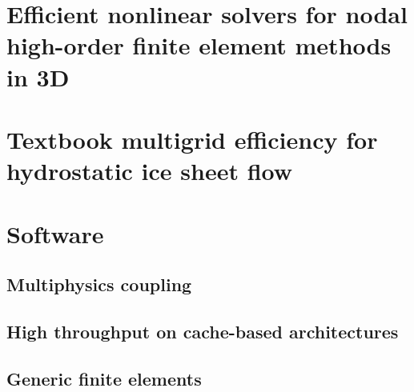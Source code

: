 \documentclass[a4paper,twoside,11pt,pdftex]{report}
\begin{document}
%       

%       

%    
\chapter{Efficient nonlinear solvers for nodal high-order finite element methods in 3D}\label{chap:dohp}

\cleardoublepage

\chapter{Textbook multigrid efficiency for hydrostatic ice sheet flow}\label{chap:tme-ice}


\cleardoublepage
\chapter{Software}\label{chap:software}

\section{Multiphysics coupling}\label{sec:multiphysics}


\section{High throughput on cache-based architectures}\label{sec:throughput}


\section{Generic finite elements}\label{sec:femassembly}

\end{document}
